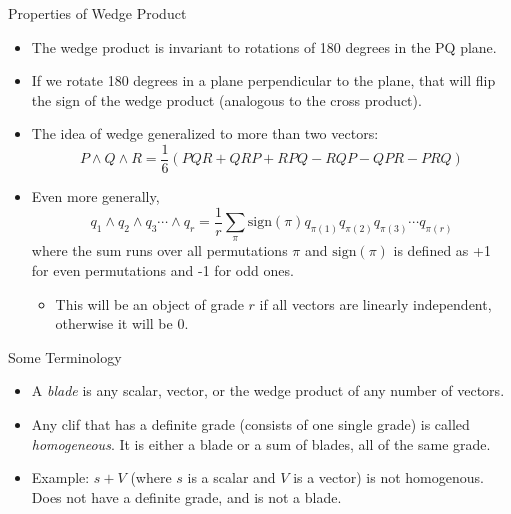 \documentclass[aspectratio=169,xcolor=dvipsnames]{beamer}
\begin{document}



\begin{frame}{Properties of Wedge Product}


\begin{itemize}
      \item The wedge product is invariant to rotations of 180 degrees in the PQ
            plane.
      \item If we rotate 180 degrees in a plane perpendicular to the plane, that will
            flip the sign of the wedge product (analogous to the cross product).
      \item The idea of wedge generalized to more than two vectors:
            $$P\land Q\land R = \frac{1}{6}(PQR+QRP+RPQ-RQP-QPR-PRQ)$$
      \item Even more generally,
            $$q_1\land q_2\land q_3\cdots\land q_r = \frac{1}{r}\sum_\pi \text{sign}(\pi)
                  q_{\pi(1)}q_{\pi(2)}q_{\pi(3)}\cdots q_{\pi(r)}$$
            where the sum runs over all permutations $\pi$ and $\text{sign}(\pi)$ is defined as +1 for even permutations and -1 for odd ones.
            \begin{itemize}
                  \item This will be an object of grade $r$ if all vectors are linearly
                        independent, otherwise it will be 0.
            \end{itemize}

\end{itemize}
\end{frame}
      


\begin{frame}{Some Terminology}


\begin{itemize}
      \item A \textit{blade} is any scalar, vector, or the wedge product of any number of
            vectors.
      \item Any clif that has a definite grade (consists of one single grade)
            is called \textit{homogeneous}. It is either a blade or a sum of blades,
            all of the same grade.
      \item Example: $s + V$ (where $s$ is a scalar and $V$ is a vector) is not homogenous. 
            Does not have a definite grade, and is not a blade.
\end{itemize}
\end{frame}
      
\end{document}
